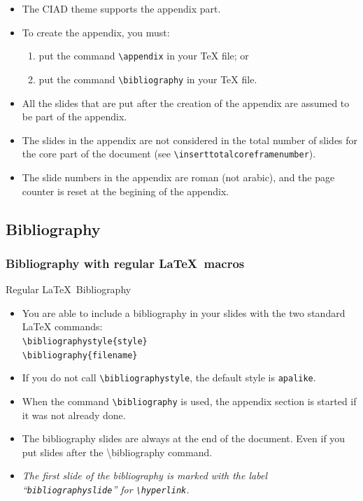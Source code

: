 \documentclass[english,sectioncirclenumberstyle]{ciadbeamer}
\begin{document}
\begin{frame}{\subsecname}
	\begin{itemize}
	\item The CIAD theme supports the appendix part.
	\vspace{1em}
	\item To create the appendix, you must:
		\begin{enumerate}
		\item put the command \texttt{{\textbackslash}appendix} in your {\TeX} file; or
		\item put the command \texttt{{\textbackslash}bibliography} in your {\TeX} file.
		\end{enumerate}
	\vspace{1em}
	\item All the slides that are put after the creation of the appendix are assumed to be part of the appendix.
	\item The slides in the appendix are not considered in the total number of slides for the core part of the document (see \texttt{{\textbackslash}inserttotalcoreframenumber}).
	\item The slide numbers in the appendix are roman (not arabic), and the page counter is reset at the begining of the appendix.
	\end{itemize}
\end{frame}

\subsection{Bibliography}

\subsubsection{Bibliography with regular \LaTeX\ macros}

\begin{frame}{Regular \LaTeX\ Bibliography}
	\begin{itemize}
	\item You are able to include a bibliography in your slides with the two standard {\LaTeX} commands: \\
		\texttt{{\textbackslash}bibliographystyle\{style\}} \\
		\texttt{{\textbackslash}bibliography\{filename\}}
	\vspace{1em}
	\item If you do not call \texttt{{\textbackslash}bibliographystyle}, the default style is \texttt{apalike}.
	\vspace{1em}
	\item When the command \texttt{{\textbackslash}bibliography} is used, the appendix section is started if it was not already done.
	\item The bibliography slides are \alert{always at the end of the document}. Even if you put slides after the {\textbackslash}bibliography command.
	\item \emph{The first slide of the bibliography is marked with the label ``\texttt{bibliographyslide}'' for \texttt{{\textbackslash}hyperlink}.}
	\end{itemize}
\end{frame}
\end{document}
